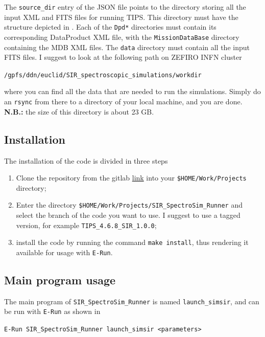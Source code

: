 The \verb+source_dir+ entry of the JSON file points to the directory storing all the input XML and FITS files for running TIPS. This directory must have the structure depicted in . Each of the \verb+Dpd*+ directories must contain its corresponding DataProduct XML file, with the \verb+MissionDataBase+ directory containing the MDB XML files. The \verb+data+ directory must contain all the input FITS files. I suggest to look at the following path on ZEFIRO INFN cluster

\begin{center}
\verb+/gpfs/ddn/euclid/SIR_spectroscopic_simulations/workdir+
\end{center}

where you can find all the data that are needed to run the simulations. Simply do an \verb+rsync+ from there to a directory of your local machine, and you are done.
\textbf{N.B.:} the size of this directory is about 23 GB.

\subsection{Installation}
The installation of the code is divided in three steps

\begin{enumerate}
\item Clone the repository from the gitlab \hyperlink{url:sir_runner_gitlab}{link} into your \verb+$HOME/Work/Projects+ directory;
\item Enter the directory \verb+$HOME/Work/Projects/SIR_SpectroSim_Runner+ and select the branch of the code you want to use. I suggest to use a tagged version, for example \verb+TIPS_4.6.8_SIR_1.0.0+;
\item install the code by running the command \verb+make install+, thus rendering it available for usage with \verb+E-Run+.
\end{enumerate}

\subsection{Main program usage}
The main program of \verb+SIR_SpectroSim_Runner+ is named \verb+launch_simsir+, and can be run with \verb+E-Run+ as shown in 

\begin{center}
\verb+E-Run SIR_SpectroSim_Runner launch_simsir <parameters>+
\end{center}

